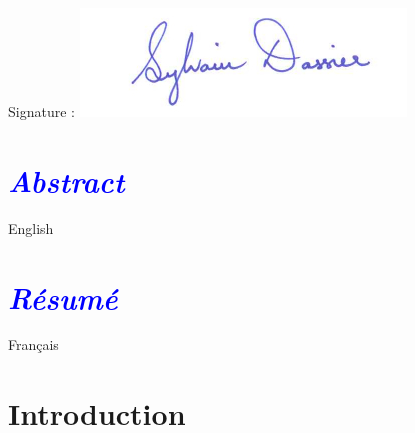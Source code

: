 \documentclass[a4paper,11pt]{article}
\begin{document}
	\vspace{-1cm}
	\hspace{5cm}
	Signature : \includegraphics[scale=0.5]{pictures/signa.jpg}
	
	\clearpage


	\section*{\Huge \textcolor{blue}{\textit{Abstract}}}
	
		\begin{description}
		
			\item \hspace{2cm} English
			
		\end{description}
		
	\section*{\Huge \textcolor{blue}{\textit{Résumé}}}
	
		\begin{description}

			\item \hspace{2cm} Français
			
		\end{description}
		
	

	\clearpage

	\setcounter{tocdepth}{3}

	\tableofcontents

	\clearpage

	
	\section{Introduction}

		\vspace{0.5cm}
\end{document}
